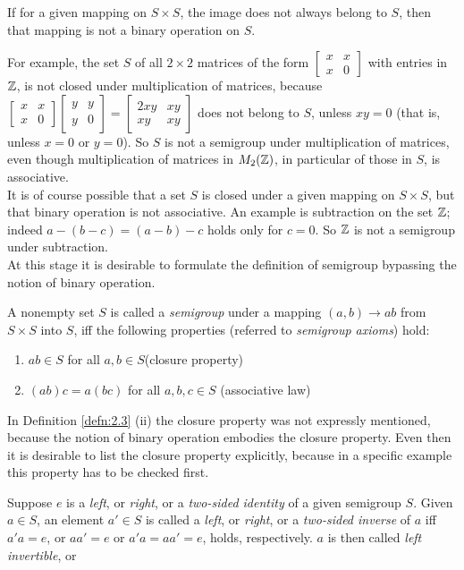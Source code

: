 \documentclass[12pt,class=book,crop=false]{standalone}
\begin{document}
\begin{rem}
    If for a given mapping on $ S\times S $, the image does not always belong to $ S $, then that mapping is not a binary operation on $ S $.
\end{rem}
For example, the set $ S $ of all $ 2 \times 2 $ matrices of the form $ \begin{bmatrix}
    x & x\\
    x & 0
\end{bmatrix} $ with entries in $ \mathbb{Z} $, is not closed under multiplication of matrices, because $ \begin{bmatrix}
    x &x\\
    x &0
\end{bmatrix}\begin{bmatrix}
    y&y\\
    y&0
\end{bmatrix} =\begin{bmatrix}
    2xy &xy\\
    xy &xy
\end{bmatrix}$ does not belong to $ S $, unless $ xy=0 $ (that is, unless $ x=0 $ or $ y =0 $). So $ S $ is not a semigroup under multiplication of matrices, even though multiplication of matrices in $ M_2(\mathbb{Z}) $, in particular of those in $ S $, is associative.\\

It is of course possible that a set $ S $ is closed under a given mapping on $ S\times S $, but that binary operation is not associative. An example is subtraction on the set $ \mathbb{Z} $; indeed $ a - (b-c)=(a - b) - c $ holds only for $ c= 0 $. So $ \mathbb{Z} $ is not a semigroup under subtraction.\\

At this stage it is desirable to formulate the definition of semigroup bypassing the notion of binary operation.
\begin{defn}
    A nonempty set $ S $ is called a \emph{semigroup} under a mapping $ (a, b) \to ab $ from $ S\times S $ into $ S $, iff the following properties (referred to \emph{semigroup axioms}) hold:
    \begin{enumerate}
        \item $ ab \in S $ for all $ a, b \in S $(closure property)
        \item $ (ab)c = a(bc) $ for all $ a, b, c\in S $ (associative law)
    \end{enumerate}
\end{defn}

In Definition \ref{defn:2.3} (ii) the closure property was not expressly mentioned, because the notion of binary operation embodies the closure property. Even then it is desirable to list the closure property explicitly, because in a specific example this property has to be checked first.
\begin{defn}
    Suppose $ e $ is a \emph{left}, or \emph{right}, or a \emph{two-sided identity} of a given semigroup $ S $. Given $ a \in S $, an element $ a' \in S $ is called a \emph{left}, or \emph{right}, or a \emph{two-sided inverse} of $ a $ iff $ a'a = e $, or $ aa'=e $ or $ a'a=aa'=e $, holds, respectively. $ a $ is then called \emph{left invertible}, or
\end{defn} 
\end{document}
